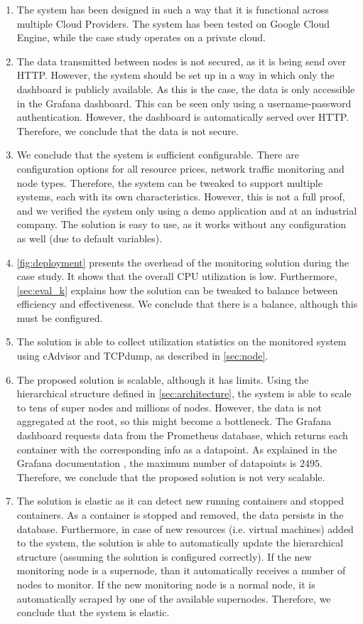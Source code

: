 \begin{enumerate}
    \item The system has been designed in such a way that it is functional across multiple Cloud Providers. The system has been tested on Google Cloud Engine, while the case study operates on a private cloud.
    \item The data transmitted between nodes is not secured, as it is being send over HTTP. However, the system should be set up in a way in which only the dashboard is publicly available. As this is the case, the data is only accessible in the Grafana dashboard. This can be seen only using a username-password authentication. However, the dashboard is automatically served over HTTP. Therefore, we conclude that the data is not secure.
    \item We conclude that the system is sufficient configurable. There are configuration options for all resource prices, network traffic monitoring and node types. Therefore, the system can be tweaked to support multiple systems, each with its own characteristics. However, this is not a full proof, and we verified the system only using a demo application and at an industrial company. The solution is easy to use, as it works without any configuration as well (due to default variables).
    \item \autoref{fig:deployment} presents the overhead of the monitoring solution during the case study. It shows that the overall CPU utilization is low. Furthermore, \autoref{sec:eval_k} explains how the solution can be tweaked to balance between efficiency and effectiveness. We conclude that there is a balance, although this must be configured.
    \item The solution is able to collect utilization statistics on the monitored system using cAdvisor and TCPdump, as described in \autoref{sec:node}.
    \item The proposed solution is scalable, although it has limits. Using the hierarchical structure defined in \autoref{sec:architecture}, the system is able to scale to tens of super nodes and millions of nodes. However, the data is not aggregated at the root, so this might become a bottleneck. The Grafana dashboard requests data from the Prometheus database, which returns each container with the corresponding info as a datapoint. As explained in the Grafana documentation \cite{grafana}, the maximum number of datapoints is $2495$. Therefore, we conclude that the proposed solution is not very scalable.
    \item The solution is elastic as it can detect new running containers and stopped containers. As a container is stopped and removed, the data persists in the database. Furthermore, in case of new resources (i.e. virtual machines) added to the system, the solution is able to automatically update the hierarchical structure (assuming the solution is configured correctly). If the new monitoring node is a supernode, than it automatically receives a number of nodes to monitor. If the new monitoring node is a normal node, it is automatically scraped by one of the available supernodes. Therefore, we conclude that the system is elastic.

\end{enumerate}

